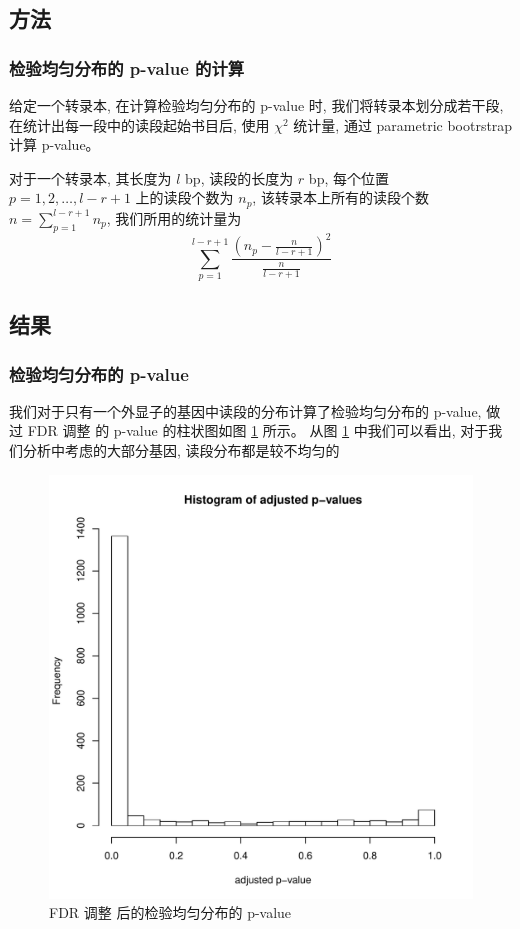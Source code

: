\subsection{方法}
\subsubsection{检验均匀分布的 p-value 的计算}
给定一个转录本, 在计算检验均匀分布的 p-value 时, 
我们将转录本划分成若干段, 在统计出每一段中的读段起始书目后, 使用 $\chi^2$ 统计量, 
通过 parametric bootrstrap \cite{efron1993introduction} 计算 p-value。 

对于一个转录本, 其长度为 $l$ bp, 读段的长度为 $r$ bp, 
每个位置 $p=1,2,\ldots,l-r+1$ 上的读段个数为 $n_p$, 
该转录本上所有的读段个数 $n=\sum_{p=1}^{l-r+1}n_p$, 
我们所用的统计量为 
\begin{equation}
\sum_{p=1}^{l-r+1} \frac{(n_p-\frac{n}{l-r+1})^2}{\frac{n}{l-r+1}}
\end{equation}

\subsection{结果}
\subsubsection{检验均匀分布的 p-value}
我们对于只有一个外显子的基因中读段的分布计算了检验均匀分布的 p-value, 
做过 FDR 调整 \cite{benjamini1995controlling} 的 p-value 
的柱状图如图 \ref{nonunif-adj-unif-pval} 所示。 
从图 \ref{nonunif-adj-unif-pval} 中我们可以看出, 
对于我们分析中考虑的大部分基因, 读段分布都是较不均匀的

\begin{figure}[!t]
\centering
\includegraphics[width=\textwidth]{figures/nonunif/padj-hist.pdf}
\caption{FDR 调整 \cite{benjamini1995controlling} 后的检验均匀分布的 p-value}
\label{nonunif-adj-unif-pval}
\end{figure}

